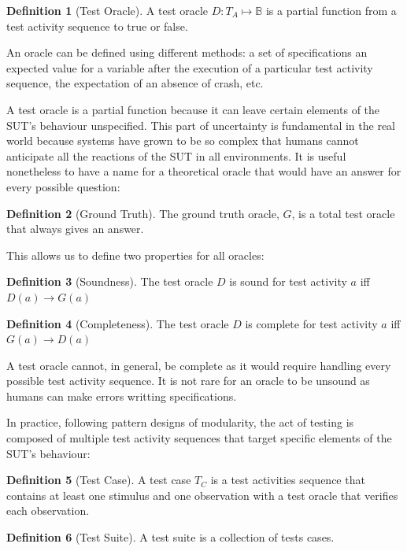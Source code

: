 \documentclass[11pt]{sdm_internship}
\theoremstyle{definition}
\newtheorem{definition}{Definition}[section]
\begin{document}
\begin{definition}[Test Oracle]
  A test oracle $D : T_A \mapsto \mathbb{B}$ is a partial function from a test activity sequence to true or false.
\end{definition}

An oracle can be defined using different methods: a set of specifications an expected value for a variable after the execution of a particular test activity sequence, the expectation of an absence of crash, etc.

A test oracle is a partial function because it can leave certain elements of the SUT's behaviour unspecified.
This part of uncertainty is fundamental in the real world because systems have grown to be so complex that humans cannot anticipate all the reactions of the SUT in all environments.
It is useful nonetheless to have a name for a theoretical oracle that would have an answer for every possible question:

\begin{definition}[Ground Truth]
  The ground truth oracle, $G$, is a total test oracle that always gives an answer.
\end{definition}

This allows us to define two properties for all oracles:

\begin{definition}[Soundness]
  The test oracle $D$ is sound for test activity $a$ iff $D(a) \rightarrow G(a)$
\end{definition}
\begin{definition}[Completeness]
  The test oracle $D$ is complete for test activity $a$ iff $G(a) \rightarrow D(a)$
\end{definition}

A test oracle cannot, in general, be complete as it would require handling every possible test activity sequence.
It is not rare for an oracle to be unsound as humans can make errors writting specifications.

In practice, following pattern designs of modularity, the act of testing is composed of multiple test activity sequences that target specific elements of the SUT's behaviour:

\begin{definition}[Test Case]
  A test case $T_C$ is a test activities sequence that contains at least one stimulus and one observation with a test oracle that verifies each observation.
\end{definition}
\begin{definition}[Test Suite]
  A test suite is a collection of tests cases.
\end{definition}
\end{document}

